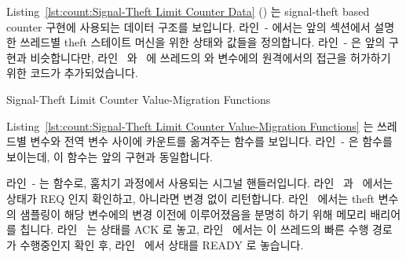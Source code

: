 \begin{lineref}
\noindent%
\begin{lineref}
Listing~\ref{lst:count:Signal-Theft Limit Counter Data}
()
는 signal-theft based counter 구현에 사용되는 데이터 구조를 보입니다.
라인~- 에서는 앞의 섹션에서 설명한 쓰레드별 theft
스테이트 머신을 위한 상태와 값들을 정의합니다.
라인~- 은 앞의 구현과 비슷합니다만, 라인~
와~ 에 쓰레드의  와  변수에의 원격에서의
접근을 허가하기 위한 코드가 추가되었습니다.

\end{lineref}

\begin{listing}[tbp]

\caption{Signal-Theft Limit Counter Value-Migration Functions}
\label{lst:count:Signal-Theft Limit Counter Value-Migration Functions}
\end{listing}

\begin{lineref}
Listing~\ref{lst:count:Signal-Theft Limit Counter Value-Migration Functions}
는 쓰레드별 변수와 전역 변수 사이에 카운트를 옮겨주는 함수를 보입니다.
라인~- 은  함수를 보이는데, 이 함수는
앞의 구현과 동일합니다.

\end{lineref}
\begin{lineref}
라인~- 는  함수로, 훔치기
과정에서 사용되는 시그널 핸들러입니다.
라인~ 과~ 에서는  상태가 REQ 인지
확인하고, 아니라면 변경 없이 리턴합니다.
라인~ 에서는 theft 변수의 샘플링이 해당 변수에의 변경 이전에
이루어졌음을 분명히 하기 위해 메모리 배리어를 칩니다.
라인~ 는  상태를 ACK 로 놓고, 라인~
에서는 이 쓰레드의 빠른 수행 경로가 수행중인지 확인 후, 라인~
에서  상태를 READY 로 놓습니다.
\iffalse


\end{lineref}
\end{lineref}
